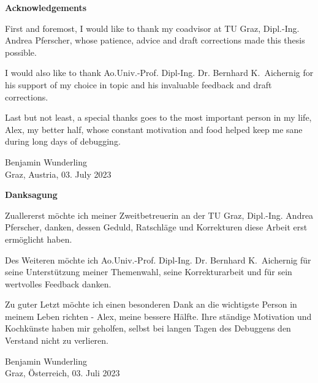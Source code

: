 



\begin{center}
{\Large\bfseries Acknowledgements}
\end{center}


\begin{changemargin}{1.5cm}{1.5cm}
First and foremost, I would like to thank my coadvisor at TU Graz, Dipl.-Ing. Andrea Pferscher, whose patience, advice and draft corrections made this thesis possible. 

I would also like to thank Ao.Univ.-Prof. Dipl-Ing. Dr. Bernhard K.~Aichernig for his support of my choice in topic and his invaluable feedback and draft corrections.

Last but not least, a special thanks goes to the most important person in my life, Alex, my better half, whose constant motivation and food helped keep me sane during long days of debugging.

\begin{flushright}
Benjamin Wunderling \\ {\small Graz, Austria, 03. July 2023}
\end{flushright}
\end{changemargin}


\newpage

\begin{center}
{\Large\bfseries Danksagung}

\end{center}

\begin{changemargin}{1.5cm}{1.5cm}
Zuallererst möchte ich meiner Zweitbetreuerin an der TU Graz, Dipl.-Ing. Andrea Pferscher, danken, dessen Geduld, Ratschläge und Korrekturen diese Arbeit erst ermöglicht haben.

Des Weiteren möchte ich Ao.Univ.-Prof. Dipl-Ing. Dr. Bernhard K.~Aichernig für seine Unterstützung meiner Themenwahl, seine Korrekturarbeit und für sein wertvolles Feedback danken.

Zu guter Letzt möchte ich einen besonderen Dank an die wichtigste Person in meinem Leben richten - Alex, meine bessere Hälfte. Ihre ständige Motivation und Kochkünste haben mir geholfen, selbst bei langen Tagen des Debuggens den Verstand nicht zu verlieren.
\begin{flushright}
Benjamin Wunderling \\ {\small Graz, \"Osterreich, 03. Juli 2023}
\end{flushright}
\end{changemargin}








